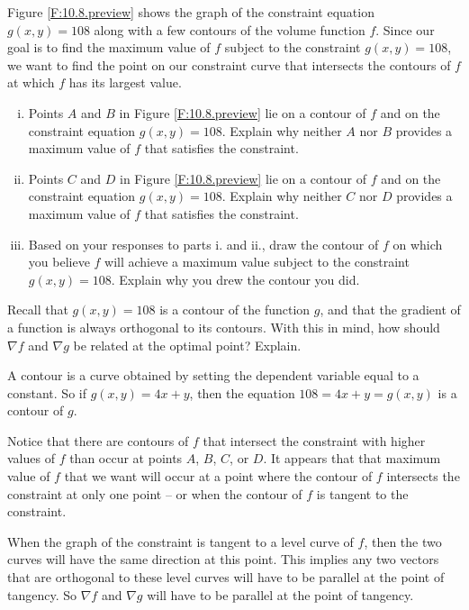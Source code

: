 \begin{pa}
    \item Figure \ref{F:10.8.preview} shows the graph of the constraint equation $g(x,y) = 108$ along with a few contours of the volume function $f$.  Since our goal is to find the maximum value of $f$ subject to the constraint $g(x,y) = 108$, we want to find the point on our constraint curve that intersects the contours of $f$ at which $f$ has its largest value. 
	\begin{enumerate}[i.]
	\item Points $A$ and $B$ in Figure \ref{F:10.8.preview} lie on a contour of $f$ and on the constraint equation $g(x,y) = 108$. Explain why neither $A$ nor $B$ provides a maximum value of $f$ that satisfies the constraint. 
	\item Points $C$ and $D$ in Figure \ref{F:10.8.preview} lie on a contour of $f$ and on the constraint equation $g(x,y) = 108$. Explain why neither $C$ nor $D$ provides a maximum value of $f$ that satisfies the constraint. 
	\item Based on your responses to parts i. and ii., draw the contour of $f$ on which you believe $f$ will achieve a maximum value subject to the constraint $g(x,y) = 108$. Explain why you drew the contour you did. 
	\end{enumerate}
	

\item Recall that $g(x,y) = 108$ is a contour of the function $g$, and that the gradient of a function is always orthogonal to its contours. With this in mind, how should $\nabla f$ and $\nabla g$ be related at the optimal point? Explain. 


    \ea
\end{pa} 

\begin{activitySolution} 
    \ba
    \item A contour is a curve obtained by setting the dependent variable equal to a constant. So if $g(x,y) = 4x+y$, then the equation $108 = 4x+y = g(x,y)$ is a contour of $g$.


    \item Notice that there are contours of $f$ that intersect the constraint with higher values of $f$ than occur at points $A$, $B$, $C$, or $D$. It appears that that maximum value of $f$ that we want will occur at a point where the contour of $f$ intersects the constraint at only one point -- or when the contour of $f$ is tangent to the constraint.


\item When the graph of the constraint is tangent to a level curve of $f$, then the two curves will have the same direction at this point. This implies any two vectors that are orthogonal to these level curves will have to be parallel at the point of tangency. So $\nabla f$ and $\nabla g$ will have to be parallel at the point of tangency.


    \ea
\end{activitySolution}
\afterpa 